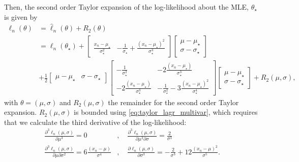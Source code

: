 Then, the second order Taylor expansion of the log-likelihood about the MLE, $\theta_{\star}$ is given by 
\begin{equation}
\begin{split}{}
      \ell_n\left(\theta\right) &= \hat{\ell}_n(\theta) + R_2(\theta) \\ & = \ell_n\left(\theta_{\star}\right) + \begin{bmatrix} \frac{x_n - \mu_{\star}}{\sigma_{\star}^2}&
-\frac{1}{\sigma_{\star}} + \frac{\left(x_n - \mu_{\star}\right)^2}{\sigma_{\star}^3}\end{bmatrix} \begin{bmatrix} \mu - \mu_{\star} \\   \sigma - \sigma_{\star} \end{bmatrix} \\ &+ \frac{1}{2} \begin{bmatrix} \mu - \mu_{\star} & \sigma - \sigma_{\star} \end{bmatrix} \begin{bmatrix}- \frac{1}{\sigma_{\star}^2} & - 2\frac{\left(x_n - \mu_{\star}\right)}{\sigma_{\star}^3} \\ -2\frac{\left(x_n - \mu_{\star}\right)}{\sigma_{\star}^3} & - \frac{1}{\sigma_{\star}^2} - 3\frac{\left(x_n - \mu_{\star}\right)^2}{\sigma_{\star}^4}\end{bmatrix} \begin{bmatrix} \mu - \mu_{\star} \\   \sigma - \sigma_{\star} \end{bmatrix}   + R_2(\mu, \sigma), 
\end{split}
\end{equation}
with $\theta = \left(\mu, \sigma\right)$ and $R_2(\mu, \sigma)$ the remainder for the second order Taylor expansion. $R_2\left(\mu, \sigma\right)$ is bounded using \eqref{eq:taylor_lagr_multivar}, which requires that we calculate the third derivative of the log-likelihood:
\begin{equation*}
\begin{split}
    \frac{\partial^3 \ell_n\left(\mu, \sigma\right)}{\partial\mu^3} = 0 &, \quad \frac{\partial^3\ell_n\left(\mu, \sigma\right)}{\partial\mu^2\partial \sigma} = \frac{2 }{\sigma^3} \\
    \frac{\partial^3\ell_n\left(\mu, \sigma\right)}{\partial\mu\partial\sigma^2} = 6\frac{\left(x_n - \mu \right)}{\sigma^4} &, \quad \frac{\partial \ell_n\left(\mu, \sigma\right)}{\partial\sigma^3} = -\frac{2}{\sigma^3} + 12\frac{\left(x_n - \mu\right)^2}{\sigma^5}. 
    \end{split}
\end{equation*}
